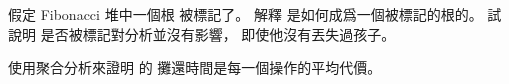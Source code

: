 \startsection[
  title={Decreasing a key and deleting a node},
  reference=section:fib_heap_delete,
]

\startEXERCISE
假定 Fibonacci 堆中一個根  被標記了。
解釋  是如何成爲一個被標記的根的。
試說明  是否被標記對分析並沒有影響，
即使他沒有丟失過孩子。
\stopEXERCISE

\startANSWER
{}
\stopANSWER

\startEXERCISE
使用聚合分析來證明  的  攤還時間是每一個操作的平均代價。
\stopEXERCISE

\startANSWER
{}
\stopANSWER

\startANSWER
\stopANSWER

\stopsection
